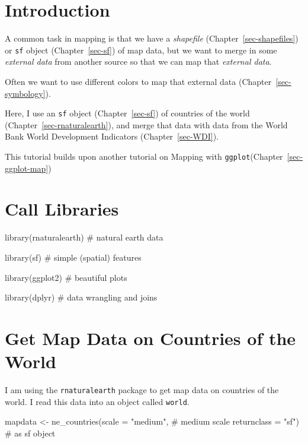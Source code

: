 \documentclass[
  letterpaper,
  DIV=11,
  numbers=noendperiod,
  oneside]{scrreprt}
\newenvironment{Shaded}{\begin{snugshade}}{\end{snugshade}}
\newcommand{\AttributeTok}[1]{\textcolor[rgb]{0.40,0.45,0.13}{#1}}
\newcommand{\CommentTok}[1]{\textcolor[rgb]{0.37,0.37,0.37}{#1}}
\newcommand{\FunctionTok}[1]{\textcolor[rgb]{0.28,0.35,0.67}{#1}}
\newcommand{\NormalTok}[1]{\textcolor[rgb]{0.00,0.23,0.31}{#1}}
\newcommand{\OtherTok}[1]{\textcolor[rgb]{0.00,0.23,0.31}{#1}}
\newcommand{\StringTok}[1]{\textcolor[rgb]{0.13,0.47,0.30}{#1}}
\begin{document}
\section{Introduction}\label{introduction-4}

A common task in mapping is that we have a \emph{shapefile}
(Chapter~\ref{sec-shapefiles}) or \texttt{sf} object
(Chapter~\ref{sec-sf}) of map data, but we want to merge in some
\emph{external data} from another source so that we can map that
\emph{external data}.

Often we want to use different colors to map that external data
(Chapter~\ref{sec-symbology}).

Here, I use an \texttt{sf} object (Chapter~\ref{sec-sf}) of countries of
the world (Chapter~\ref{sec-rnaturalearth}), and merge that data with
data from the World Bank World Development Indicators
(Chapter~\ref{sec-WDI}).

This tutorial builds upon another tutorial on Mapping with
\texttt{ggplot}(Chapter~\ref{sec-ggplot-map})

\section{Call Libraries}\label{call-libraries-4}

\begin{Shaded}
\begin{Highlighting}[]
\FunctionTok{library}\NormalTok{(rnaturalearth) }\CommentTok{\# natural earth data}

\FunctionTok{library}\NormalTok{(sf) }\CommentTok{\# simple (spatial) features}

\FunctionTok{library}\NormalTok{(ggplot2) }\CommentTok{\# beautiful plots}

\FunctionTok{library}\NormalTok{(dplyr) }\CommentTok{\# data wrangling and joins}
\end{Highlighting}
\end{Shaded}

\section{Get Map Data on Countries of the
World}\label{get-map-data-on-countries-of-the-world}

I am using the \texttt{rnaturalearth} package to get map data on
countries of the world. I read this data into an object called
\texttt{world}.

\begin{Shaded}
\begin{Highlighting}[]
\NormalTok{mapdata }\OtherTok{\textless{}{-}} \FunctionTok{ne\_countries}\NormalTok{(}\AttributeTok{scale =} \StringTok{"medium"}\NormalTok{, }\CommentTok{\# medium scale}
                        \AttributeTok{returnclass =} \StringTok{"sf"}\NormalTok{) }\CommentTok{\# as sf object}
\end{Highlighting}
\end{Shaded}
\end{document}
